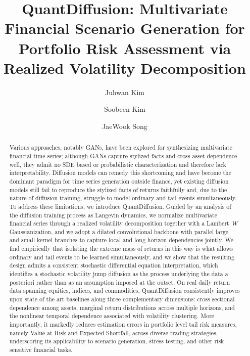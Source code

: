 \documentclass[sigconf,natbib=false]{acmart}
\begin{document}
\title{QuantDiffusion: Multivariate Financial Scenario Generation for Portfolio Risk Assessment via Realized Volatility Decomposition}

\author{Juhwan Kim}

\author{Soobeen Kim}

\author{JaeWook Song}

\renewcommand{\shortauthors}{Kim et al.}

\begin{abstract}
Various approaches, notably GANs, have been explored for synthesizing multivariate financial time series; although GANs capture stylized facts and cross asset dependence well, they admit no SDE based or probabilistic characterization and therefore lack interpretability. Diffusion models can remedy this shortcoming and have become the dominant paradigm for time series generation outside finance, yet existing diffusion models still fail to reproduce the stylized facts of returns faithfully and, due to the nature of diffusion training, struggle to model ordinary and tail events simultaneously. To address these limitations, we introduce QuantDiffusion. Guided by an analysis of the diffusion training process as Langevin dynamics, we normalize multivariate financial series through a realized volatility decomposition together with a Lambert~$W$ Gaussianization, and we adopt a dilated convolutional backbone with parallel large and small kernel branches to capture local and long horizon dependencies jointly. We find empirically that isolating the extreme mass of returns in this way is what allows ordinary and tail events to be learned simultaneously, and we show that the resulting design admits a consistent stochastic differential equation interpretation, which identifies a stochastic volatility jump diffusion as the process underlying the data a posteriori rather than as an assumption imposed at the outset. On real daily return data spanning equities, indices, and commodities, QuantDiffusion consistently improves upon state of the art baselines along three complementary dimensions: cross sectional dependence among assets, marginal return distributions across multiple horizons, and the nonlinear temporal dependence associated with volatility clustering. More importantly, it markedly reduces estimation errors in portfolio level tail risk measures, namely Value at Risk and Expected Shortfall, across diverse trading strategies, underscoring its applicability to scenario generation, stress testing, and other risk sensitive financial tasks.
\end{abstract}
\end{document}
